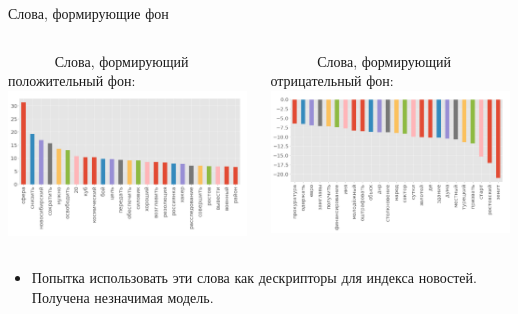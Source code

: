 \documentclass[c, dvipsnames]{beamer}  %
\begin{document}
\begin{frame}{Слова, формирующие фон}
\vspace{0.2cm}
\begin{columns}
	\begin{column}{.48\linewidth}
	    	{\tiny  \centering  $\qquad \quad $  Слова, формирующий положительный фон:} \\
	    	\includegraphics[width=0.99\textwidth]{top-word.png}
	\end{column}
	\begin{column}{.48\linewidth}
    	{\tiny \centering $\qquad \quad$ Слова, формирующий отрицательный фон: } \\
    	\includegraphics[width=0.99\textwidth]{bottom-word.png}
	\end{column}
\end{columns}

\begin{itemize}
\item Попытка использовать эти слова как дескрипторы для индекса новостей. Получена незначимая модель. 
\end{itemize}
\end{frame}
\end{document}
